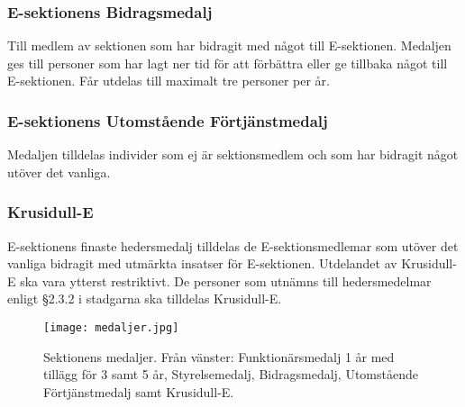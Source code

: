 \documentclass[10pt]{article}
\begin{document}
\subsubsection*{E-sektionens Bidragsmedalj}
Till medlem av sektionen som har bidragit med något till E-sektionen. Medaljen ges till personer som har lagt ner tid för att förbättra eller ge tillbaka något till E-sektionen. Får utdelas till maximalt tre personer per år.

\subsubsection*{E-sektionens Utomstående Förtjänstmedalj}
Medaljen tilldelas individer som ej är sektionsmedlem och som har bidragit något utöver det vanliga.

\subsubsection*{Krusidull-E}
E-sektionens finaste hedersmedalj tilldelas de E-sektionsmedlemar som utöver det vanliga bidragit med utmärkta insatser för E-sektionen. Utdelandet av Krusidull-E ska vara ytterst restriktivt. De personer som utnämns till hedersmedelmar enligt §2.3.2 i stadgarna ska tilldelas Krusidull-E.

\begin{figure}[H]
\begin{center}
    \texttt{[image: medaljer.jpg]}\\
\end{center}
{Sektionens medaljer. Från vänster: Funktionärsmedalj 1 år med tillägg för 3 samt 5 år, Styrelsemedalj, Bidragsmedalj, Utomstående Förtjänstmedalj samt Krusidull-E.}
\end{figure}
\end{document}
